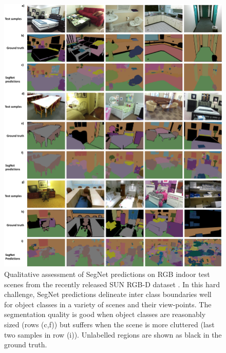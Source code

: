 \begin{figure}
\centering
\includegraphics[width=\textwidth]{segnet/SUNRGBDQualy2.pdf}
\caption[SegNet qualitative results on RGB-D dataset.]{Qualitative assessment of SegNet predictions on RGB indoor test scenes from the recently released SUN RGB-D dataset \citep{song2015sun}. In this hard challenge, SegNet predictions delineate inter class boundaries well for object classes in a variety of scenes and their view-points. The segmentation quality is good when object classes are reasonably sized (rows (c,f)) but suffers when the scene is more cluttered (last two samples in row (i)). Unlabelled regions are shown as black in the ground truth.}
\label{SUNRGBDQualy}
\end{figure}

